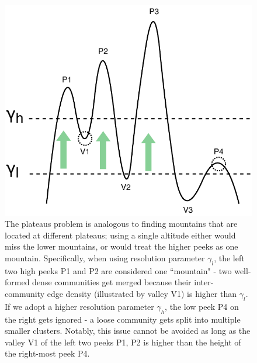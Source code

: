 \begin{figure}
    \centering
    \includegraphics[width=.6\textwidth]{img/chap2/altitude.pdf}
    \caption{The plateaus problem is analogous to finding mountains that are located at different plateaus; using a single altitude either would miss the lower mountains, or would treat the higher peeks as one mountain. Specifically, when using resolution parameter $\gamma_l$, the left two high peeks P1 and P2 are considered one ``mountain" - two well-formed dense communities get merged because their inter-community edge density (illustrated by valley V1) is higher than $\gamma_l$. If we adopt a higher resolution parameter $\gamma_h$, the low peek P4 on the right gets ignored - a loose community gets split into multiple smaller clusters. Notably, this issue cannot be avoided as long as the valley V1 of the left two peeks P1, P2 is higher than the height of the right-most peek P4.}
    \label{fig:plateaus}
\end{figure}

